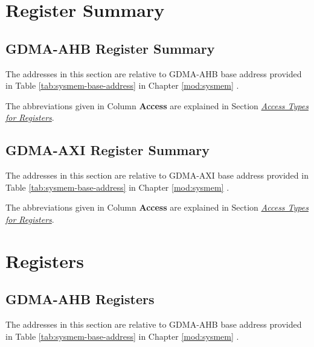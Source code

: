 \documentclass[main\_\_EN.tex]{subfiles}
\begin{document}
\newpage
\begin{landscape}
\hypertarget{dma-reg-summ}{}
\section{Register Summary}
\label{sec:dma-reg-summ}

\subsection{GDMA-AHB Register Summary}

The addresses in this section are relative to GDMA-AHB base address provided in Table \ref{tab:sysmem-base-address} in Chapter \ref{mod:sysmem} \textit{}.

The abbreviations given in Column \textbf{Access} are explained in Section \hyperref[glossary-access-types]{\textit{Access Types for Registers}}.



\subsection{GDMA-AXI Register Summary}

The addresses in this section are relative to GDMA-AXI base address provided in Table \ref{tab:sysmem-base-address} in Chapter \ref{mod:sysmem} \textit{}.

The abbreviations given in Column \textbf{Access} are explained in Section \hyperref[glossary-access-types]{\textit{Access Types for Registers}}.


\end{landscape}



\newpage
\section{Registers}

\subsection{GDMA-AHB Registers}

The addresses in this section are relative to GDMA-AHB base address provided in Table \ref{tab:sysmem-base-address} in Chapter \ref{mod:sysmem} \textit{}.
\end{document}
